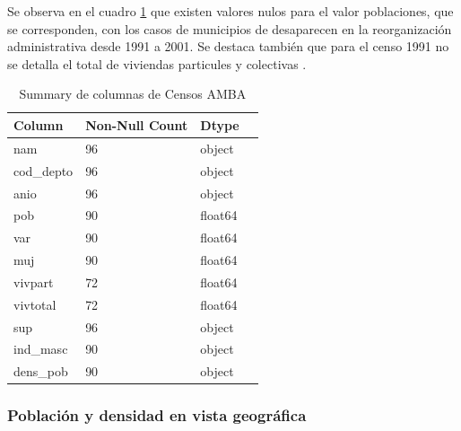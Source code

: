 \documentclass{article}
\theoremstyle{mytheoremstyle}
\theoremstyle{mytheoremstyle}
\theoremstyle{myproblemstyle}
\begin{document}
  Se observa en el cuadro \ref{tab:summaryCensos} que existen valores nulos para el valor poblaciones, que se corresponden,
   con los casos de municipios de desaparecen en la reorganización administrativa desde 1991 a 2001. Se destaca también que 
   para el censo 1991 no se detalla el total de viviendas particules y colectivas .

  \begin{table}[htbp]
    \centering
    \caption{Summary de columnas de Censos AMBA}
    \label{tab:summaryCensos}
    \begin{tabular}{llll}
        \toprule
        \textbf{Column} & \textbf{Non-Null Count} & \textbf{Dtype} \\
        \midrule
        nam & 96 & object \\
        cod\_depto & 96 & object \\
        anio & 96 & object \\
        pob & 90 & float64 \\
        var & 90 & float64 \\
        muj & 90 & float64 \\
        vivpart & 72 & float64 \\
        vivtotal & 72 & float64 \\
        sup & 96 & object \\
        ind\_masc & 90 & object \\
        dens\_pob & 90 & object \\
        \bottomrule
    \end{tabular}
\end{table}
  


\subsubsection{Población y densidad en vista geográfica}
 

 
\end{document}
